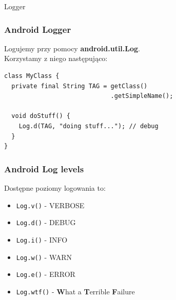 % 
% 
% 
% 
% 
% 
% 


\begin{frame}
 \begin{center}
  \Huge{Logger}
 \end{center}

\end{frame}



\begin{frame}[fragile]\frametitle{Android Logger}
Logujemy przy pomocy \textbf{android.util.Log}.\\
Korzystamy z niego następująco:

\begin{lstlisting}
class MyClass {
  private final String TAG = getClass()
                             .getSimpleName();

  void doStuff() {
    Log.d(TAG, "doing stuff..."); // debug
  }
}
\end{lstlisting}
\end{frame}

\begin{frame}[fragile]\frametitle{Android Log levels}
Dostępne poziomy logowania to:
\begin{itemize}
 \item \verb|Log.v()| - VERBOSE
 \item \verb|Log.d()| - DEBUG
 \pause \item \verb|Log.i()| - INFO
 \pause \item \verb|Log.w()| - WARN
 \pause \item \verb|Log.e()| - ERROR
 \pause \item \verb|Log.wtf()| \pause - \textbf{W}hat a \textbf{T}errible \textbf{F}ailure
\end{itemize}

\end{frame}

